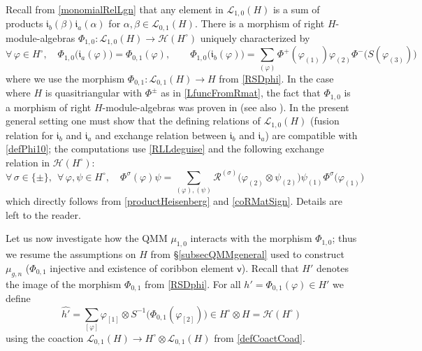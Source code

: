\documentclass[11pt]{amsart}
\begin{document}
\indent Recall from \eqref{monomialRelLgn} that any element in $\mathcal{L}_{1,0}(H)$ is a sum of products $\mathfrak{i}_b(\beta)\mathfrak{i}_a(\alpha)$ for $\alpha,\beta \in \mathcal{L}_{0,1}(H)$. There is a morphism of right $H$-module-algebras $\Phi_{1,0} : \mathcal{L}_{1,0}(H) \to \mathcal{H}(H^{\circ})$ uniquely characterized by
\begin{equation}\label{defPhi10}
\forall \, \varphi \in H^\circ, \quad \Phi_{1,0}\bigl( \mathfrak{i}_a(\varphi) \bigr) = \Phi_{0,1}(\varphi), \qquad \Phi_{1,0}\bigl( \mathfrak{i}_b(\varphi) \bigr) = \sum_{(\varphi)}\Phi^+(\varphi_{(1)})\varphi_{(2)}\Phi^-\bigl( S(\varphi_{(3)}) \bigr)
\end{equation}
where we use the morphism $\Phi_{0,1} : \mathcal{L}_{0,1}(H) \to H$ from \eqref{RSDphi}. In the case where $H$ is quasitriangular with $\Phi^\pm$ as in \eqref{LfuncFromRmat}, the fact that $\Phi_{1,0}$ is a morphism of right $H$-module-algebras was proven in \cite{Al} (see also \cite[\S 3.3]{BFR}). In the present general setting one must show that the defining relations of $\mathcal{L}_{1,0}(H)$ (fusion relation for $\mathfrak{i}_b$ and $\mathfrak{i}_a$ and exchange relation between $\mathfrak{i}_b$ and $\mathfrak{i}_a$) are compatible with \eqref{defPhi10}; the computations use \eqref{RLLdeguise} and the following exchange relation in $\mathcal{H}(H^{\circ})$:
\begin{equation}\label{exchangeRelHeisenberg}
\forall \, \sigma \in \{\pm\}, \:\: \forall \, \varphi,\psi \in H^{\circ}, \quad \Phi^{\sigma}(\varphi)\psi = \sum_{(\varphi),(\psi)}\mathcal{R}^{(\sigma)}\bigl(\varphi_{(2)} \otimes \psi_{(2)}\bigr)\psi_{(1)}\Phi^{\sigma}\bigl(\varphi_{(1)}\bigr)
\end{equation}
which directly follows from \eqref{productHeisenberg} and \eqref{coRMatSign}. Details are left to the reader.

\smallskip

\indent Let us now investigate how the QMM $\mu_{1,0}$ interacts with the morphism $\Phi_{1,0}$; thus we resume the assumptions on $H$ from \S\ref{subsecQMMgeneral} used to construct $\mu_{g,n}$ ($\Phi_{0,1}$ injective and existence of coribbon element $\mathsf{v}$). Recall that $H'$ denotes the image of the morphism $\Phi_{0,1}$ from \eqref{RSDphi}. For all $h' = \Phi_{0,1}(\varphi) \in H'$ we define
\begin{equation}\label{elmtsChapeau}
\widehat{h'} = \sum_{[\varphi]} \varphi_{[1]} \otimes S^{-1}\bigl( \Phi_{0,1}(\varphi_{[2]}) \bigr) \in H^\circ \otimes H = \mathcal{H}(H^\circ)
\end{equation}
using the coaction $\mathcal{L}_{0,1}(H) \to H^\circ \otimes \mathcal{L}_{0,1}(H)$ from \eqref{defCoactCoad}. 
\end{document}
